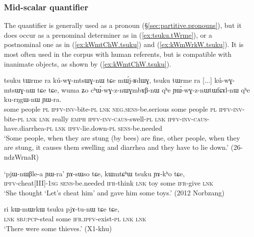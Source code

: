 \subsubsection{Mid-scalar quantifier} \label{sec:tsuku}
The quantifier  is generally used as a pronoun (§\ref{sec:partitive.pronouns}), but it does occur as a prenominal determiner as in (\ref{ex:tsuku.tWrme}), or a postnominal one as in (\ref{ex:kWmtChW.tsuku}) and (\ref{ex:kWmWrkW.tsuku}). It is most often used in the corpus with human referents, but is compatible with inanimate objects, as shown by (\ref{ex:kWmtChW.tsuku}).

\begin{exe}
\ex \label{ex:tsuku.tWrme}
\gll tsuku tɯrme ra kú-wɣ-mtsɯɣ-nɯ tɕe mɯ́j-ʁdɯɣ, tsuku tɯrme ra [...] kú-wɣ-mtsɯɣ-nɯ tɕe tɕe, wuma ʑo cʰɯ́-wɣ-z-nɯɣmbɤβ-nɯ qʰe ɲɯ́-wɣ-z-nɯtɯfɕɤl-nɯ qʰe ku-rŋgɯ-nɯ ɲɯ-ra.\\
some people \textsc{pl} \textsc{ipfv}-\textsc{inv}-bite-\textsc{pl} \textsc{lnk} \textsc{neg}.\textsc{sens}-be.serious some people \textsc{pl} { } \textsc{ipfv}-\textsc{inv}-bite-\textsc{pl} \textsc{lnk} \textsc{lnk} really \textsc{emph} \textsc{ipfv}-\textsc{inv}-\textsc{caus}-swell-\textsc{pl} \textsc{lnk}  \textsc{ipfv}-\textsc{inv}-\textsc{caus}-have.diarrhea-\textsc{pl} \textsc{lnk} \textsc{ipfv}-lie.down-\textsc{pl} \textsc{sens}-be.needed\\
\glt `Some people, when they are stung (by bees) are fine, other people, when they are stung, it causes them swelling and diarrhea and they have to lie down.' (26-ndzWrnaR)
\end{exe}

\begin{exe}
\ex \label{ex:kWmtChW.tsuku}
\gll  `pjɯ-nɯβle-a ɲɯ-ra' ɲɤ-sɯso tɕe, kɯmtɕʰɯ tsuku ɲɤ-kʰo tɕe, \\
\textsc{ipfv}-cheat[III]-\textsc{1sg} \textsc{sens}-be.needed \textsc{ifr}-think \textsc{lnk} toy some \textsc{ifr}-give \textsc{lnk} \\
\glt `She thought `Let's cheat him' and gave him some toys.' (2012 Norbzang)
\end{exe}

\begin{exe}
\ex \label{ex:kWmWrkW.tsuku}
\gll ri kɯ-mɯrkɯ tsuku pjɤ-tu-nɯ tɕe tɕe, \\
\textsc{lnk} \textsc{sbj}:\textsc{pcp}-steal some \textsc{ifr}.\textsc{ipfv}-exist-\textsc{pl} \textsc{lnk} \textsc{lnk} \\
\glt `There were some thieves.' (X1-khu)
\end{exe}

